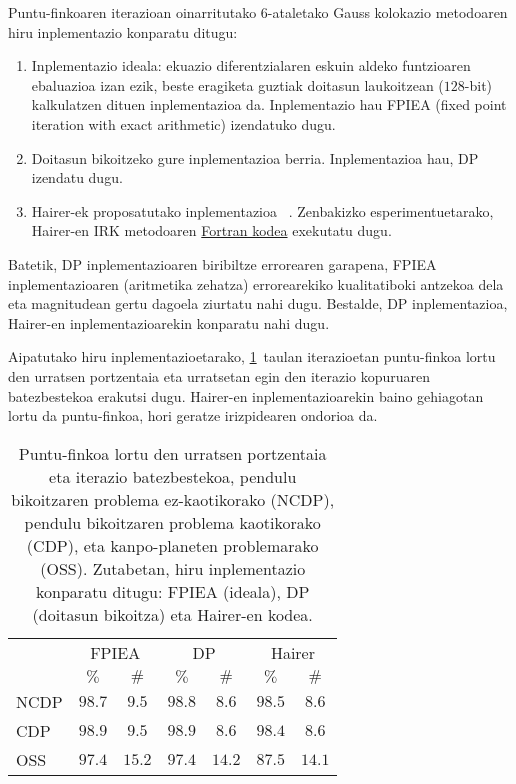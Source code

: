 Puntu-finkoaren iterazioan oinarritutako $6$-ataletako Gauss kolokazio metodoaren hiru inplementazio konparatu ditugu:
\begin{enumerate}
\item Inplementazio ideala: ekuazio diferentzialaren eskuin aldeko funtzioaren ebaluazioa izan ezik, beste eragiketa guztiak doitasun laukoitzean ($128$-bit) kalkulatzen dituen inplementazioa da. Inplementazio hau FPIEA (fixed point iteration with exact arithmetic) izendatuko dugu.

\item Doitasun bikoitzeko gure inplementazioa berria. Inplementazioa hau, DP izendatu dugu.

\item Hairer-ek proposatutako inplementazioa ~\cite{Hairer2008}. Zenbakizko esperimentuetarako, Hairer-en IRK metodoaren \href{http://www.unige.ch/~hairer/preprints.html}{Fortran kodea} exekutatu dugu.     

\end{enumerate}

Batetik, DP inplementazioaren biribiltze errorearen garapena, FPIEA  inplementazioaren (aritmetika zehatza) errorearekiko kualitatiboki antzekoa dela eta magnitudean gertu dagoela ziurtatu nahi dugu. Bestalde, DP inplementazioa, Hairer-en inplementazioarekin konparatu nahi dugu.

Aipatutako hiru inplementazioetarako, \ref{tab:fperr}~taulan iterazioetan puntu-finkoa lortu den urratsen portzentaia eta urratsetan egin den iterazio kopuruaren batezbestekoa erakutsi dugu. Hairer-en inplementazioarekin baino gehiagotan lortu da puntu-finkoa, hori geratze irizpidearen ondorioa da.

\begin{table}
\caption[Puntu-fikoaren iterazio portzentaia eta iterazio kopuruaren batezbestekoa] 
{\small{ Puntu-finkoa lortu den urratsen portzentaia eta iterazio batezbestekoa, pendulu bikoitzaren problema ez-kaotikorako (NCDP), pendulu bikoitzaren problema kaotikorako (CDP), eta kanpo-planeten problemarako (OSS). Zutabetan, hiru inplementazio konparatu ditugu: FPIEA (ideala), DP (doitasun bikoitza) eta Hairer-en kodea.}}
\label{tab:fperr}       %
\centering
{%
\begin{tabular}{ l c c c c c c } 
 \hline
                 &  \multicolumn{2}{c}{FPIEA}  & \multicolumn{2}{c}{DP} & \multicolumn{2}{c}{Hairer} \\
                 &     $\%$        &  $\#$        &      $\%$           &   $\#$      &    $\%$       &  $\#$      \\
 \hline
 NCDP            & $98.7$    & $9.5$   & $98.8$     & $8.6$   &  $98.5$ & $8.6$  \\ 
 CDP             & $98.9$    & $9.5$   & $98.9$     & $8.6$   &  $98.4$ & $8.6$  \\ 
 OSS             & $97.4$    & $15.2$  & $97.4$     & $14.2$  &  $87.5$ & $14.1$ \\ 
   \hline
 \end{tabular}}
 \end{table}


